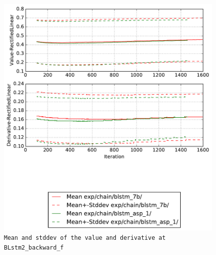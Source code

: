 \documentclass[prl,10pt,twocolumn]{revtex4}
\begin{document}
\newpage
\begin{figure}[h]
  \begin{center}
    \caption{\texttt{Mean and stddev of the value and derivative at BLstm2\_backward\_f}}
    \includegraphics[width=\textwidth]{exp/chain/blstm_7b/report/nonlinstats_BLstm2_backward_f.pdf}
  \end{center}
\end{figure}
\clearpage
\end{document}
